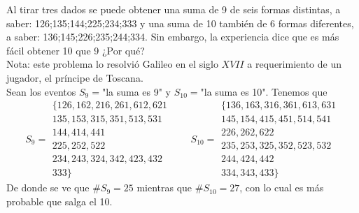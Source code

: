 \item Al tirar tres dados se puede obtener una suma de 9 de seis formas distintas, a saber: 126;135;144;225;234;333 y una suma de 10 también de 6 formas diferentes, a saber: 136;145;226;235;244;334. Sin embargo, la experiencia dice que es más fácil obtener 10 que 9 ¿Por qué?\\
Nota: este problema lo resolvió Galileo en el siglo $XVII$ a requerimiento de un jugador, el príncipe de Toscana.\e\\
    Sean los eventos $S_9=$"la suma es 9" y $S_{10}=$"la suma es 10". Tenemos que\[
    S_9=\begin{array}{l}
        \{126,162,216,261,612,621\\
        135,153,315,351,513,531\\
        144,414,441\\
        225,252,522\\
        234,243,324,342,423,432\\
        333\}
    \end{array}\qquad S_{10}=\begin{array}{l}
        \{136,163,316,361,613,631\\
        145,154,415,451,514,541\\
        226,262,622\\
        235,253,325,352,523,532\\
        244,424,442\\
        334,343,433\}
    \end{array}
    \]
    De donde se ve que $\#S_9=25$ mientras que $\#S_10=27$, con lo cual es más probable que salga el 10.